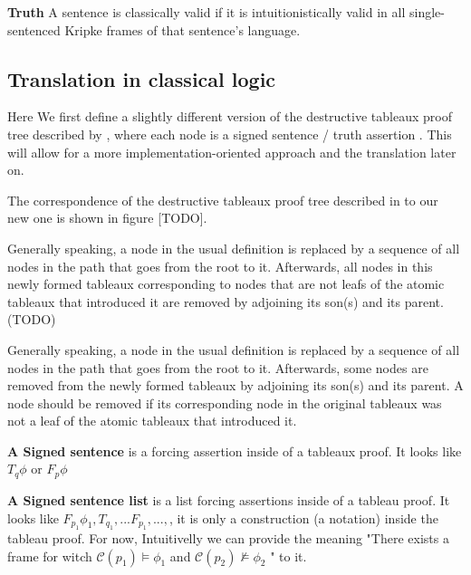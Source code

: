 \documentclass[runningheads]{llncs}
\begin{document}
\begin{definition}
    \textbf{Truth}
    A sentence is classically valid if it is intuitionistically valid in all single-sentenced Kripke frames of that sentence's language. 
\end{definition}

\subsection{Translation in classical logic}
    Here We first define a slightly different version of the destructive tableaux proof tree described by \cite{book1}, where each node is a signed sentence  / truth assertion . This will allow for a more implementation-oriented approach and the translation later on. 
    
    The correspondence of the destructive tableaux proof tree described in \cite{book1} to our new one is shown in figure [TODO].
    
    Generally speaking,
    a node in the usual definition is replaced by a sequence of 
    all nodes in the path that goes from the root to it. Afterwards, all nodes in this newly formed tableaux corresponding to nodes that are not leafs of the atomic tableaux that introduced it are removed by adjoining its son(s) and its parent.  (TODO)

     Generally speaking,
    a node in the usual definition is replaced by a sequence of 
    all nodes in the path that goes from the root to it. Afterwards, some nodes are removed from the newly formed tableaux by adjoining its son(s) and its parent. A node should be removed if its corresponding node in the original tableaux was not a leaf of the atomic tableaux that introduced it.   

\begin{definition}
    \textbf{A Signed sentence} is a forcing assertion inside of a tableaux proof. It looks like $T_{q} \phi $ or $F_{p} \phi $
\end{definition}

\begin{definition}
    \textbf{A Signed sentence list} is a list forcing assertions inside of a tableau proof. It looks like $F_{p_1} \phi_{1}, T_{q_1}, ... F_{p_1}, ..., $, it is only a construction (a notation) inside the tableau proof. For now, 
    Intuitivelly we can provide the meaning "There exists a frame for witch $ \mathcal{C}(p_{1}) \vDash \phi_{1}$ and $ \mathcal{C}(p_{2}) \nvDash \phi_{2}$ " to it.
\end{definition}
 
\end{document}
